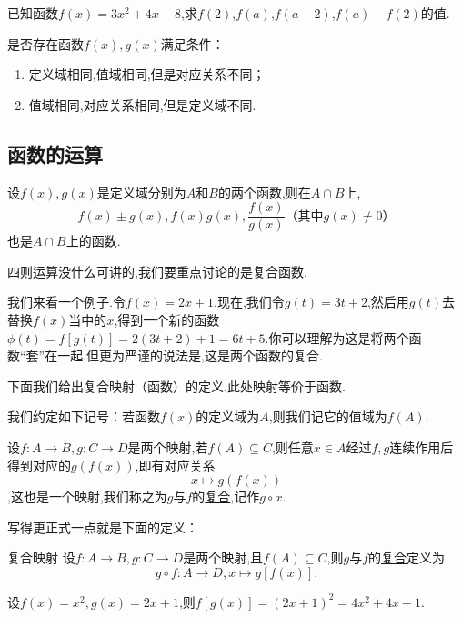 \documentclass[lang=cn,math=cm,chinesefont=nofont,11pt,scheme=chinese,twocol]{elegantbook}
\begin{document}
\begin{exercise}
  已知函数$f(x)=3x^2+4x-8$,求$f(2)$,$f(a)$,$f(a-2)$,$f(a)-f(2)$的值.
\end{exercise}

\begin{exercise}\label{2017RJA.P74.17}
  是否存在函数$f(x),g(x)$满足条件：
\end{exercise}

\begin{enumerate}
  \item 定义域相同,值域相同,但是对应关系不同；
  \item 值域相同,对应关系相同,但是定义域不同.
\end{enumerate}

\subsection{函数的运算}

设$f(x),g(x)$是定义域分别为$A$和$B$的两个函数,则在$A\cap B$上,$$f(x)\pm g(x),f(x)g(x),\dfrac{f(x)}{g(x)}\text{（其中}g(x)\neq 0\text{）}$$也是$A\cap B$上的函数.

四则运算没什么可讲的,我们要重点讨论的是复合函数.

我们来看一个例子.令$f(x)=2x+1$,现在,我们令$g(t)=3t+2$,然后用$g(t)$去替换$f(x)$当中的$x$,得到一个新的函数$\phi(t)=f[g(t)]=2(3t+2)+1=6t+5$.你可以理解为这是将两个函数“套”在一起,但更为严谨的说法是,这是两个函数的复合.

下面我们给出复合映射（函数）的定义.此处映射等价于函数.

\begin{remark}
  我们约定如下记号：若函数$f(x)$的定义域为$A$,则我们记它的值域为$f(A)$.
\end{remark}

设$f:A\rightarrow B,g:C\rightarrow D$是两个映射,若$f(A)\subseteq C$,则任意$x\in A$经过$f,g$连续作用后得到对应的$g(f(x))$,即有对应关系$$x\mapsto g(f(x))$$,这也是一个映射,我们称之为$g$与$f$的\underline{复合},记作$g\circ x$.

写得更正式一点就是下面的定义：

\begin{definition}{复合映射}
  设$f:A\rightarrow B,g:C\rightarrow D$是两个映射,且$f(A)\subseteq C$,则$g$与$f$的\underline{复合}定义为$$g\circ f:A\rightarrow D,x\mapsto g[f(x)].$$
\end{definition}

\begin{example}
  设$f(x)=x^2,g(x)=2x+1$,则$f[g(x)]=(2x+1)^2=4x^2+4x+1$.
\end{example}
\end{document}
